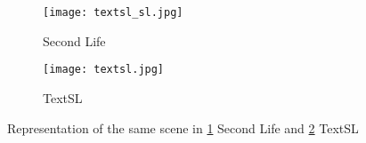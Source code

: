 \begin{figure}
  \centering
  \begin{subfigure}{0.48\textwidth}
    \centering
    \texttt{[image: textsl\_sl.jpg]}
    \caption{Second Life}
    \label{fig:textsl_second_life}
  \end{subfigure}
  \hspace{0.1em}
  \begin{subfigure}{0.48\textwidth}
    \centering
    \texttt{[image: textsl.jpg]}
    \caption{TextSL}
    \label{fig:textsl_interface}
  \end{subfigure}
  \caption[]{Representation of the same scene in \ref{fig:textsl_second_life} Second Life and \ref{fig:textsl_interface} TextSL}
  \label{fig:textsl}
\end{figure}
